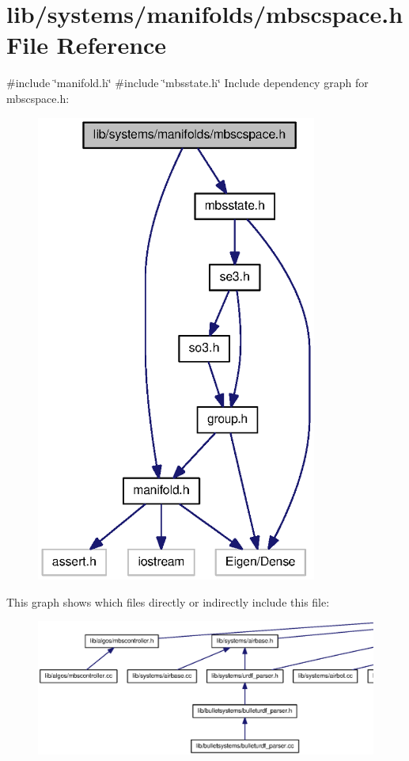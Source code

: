 \section{lib/systems/manifolds/mbscspace.h \-File \-Reference}
\label{mbscspace_8h}
{\ttfamily \#include \char`\"{}manifold.\-h\char`\"{}}\*
{\ttfamily \#include \char`\"{}mbsstate.\-h\char`\"{}}\*
\-Include dependency graph for mbscspace.\-h\-:
\nopagebreak
\begin{figure}[H]
\begin{center}
\leavevmode
\includegraphics[width=262pt]{mbscspace_8h__incl}
\end{center}
\end{figure}
\-This graph shows which files directly or indirectly include this file\-:
\nopagebreak
\begin{figure}[H]
\begin{center}
\leavevmode
\includegraphics[width=350pt]{mbscspace_8h__dep__incl}
\end{center}
\end{figure}
